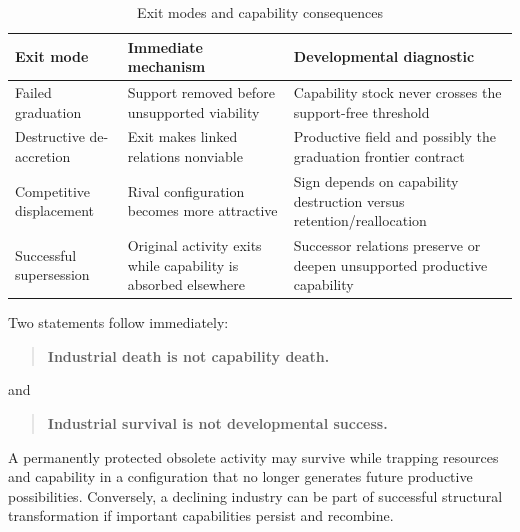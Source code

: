 \begin{table}[ht]
\centering
\caption{Exit modes and capability consequences}
\label{tab:exit}
\small
\begin{tabular}{>{\raggedright\arraybackslash}p{}>{\raggedright\arraybackslash}p{}>{\raggedright\arraybackslash}p{}}
\toprule
\textbf{Exit mode} & \textbf{Immediate mechanism} & \textbf{Developmental diagnostic}\\
\midrule
Failed graduation & Support removed before unsupported viability & Capability stock never crosses the support-free threshold\\
Destructive de-accretion & Exit makes linked relations nonviable & Productive field and possibly the graduation frontier contract\\
Competitive displacement & Rival configuration becomes more attractive & Sign depends on capability destruction versus retention/reallocation\\
Successful supersession & Original activity exits while capability is absorbed elsewhere & Successor relations preserve or deepen unsupported productive capability\\
\bottomrule
\end{tabular}
\end{table}

Two statements follow immediately:
\begin{quote}
\textbf{Industrial death is not capability death.}
\end{quote}
and
\begin{quote}
\textbf{Industrial survival is not developmental success.}
\end{quote}
A permanently protected obsolete activity may survive while trapping resources and capability in a configuration that no longer generates future productive possibilities. Conversely, a declining industry can be part of successful structural transformation if important capabilities persist and recombine.
